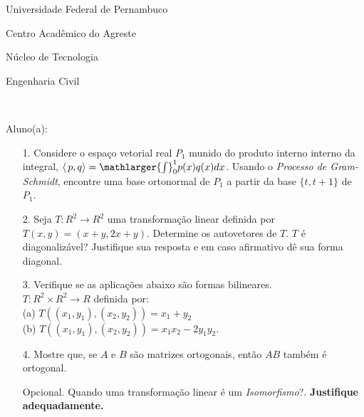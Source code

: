 \documentclass[oneside,a4paper,12pt]{article}
\newcommand{\universidade}{Universidade Federal de Pernambuco}
\newcommand{\centro}{Centro Acadêmico do Agreste}
\newcommand{\departamento}{Núcleo de Tecnologia}
\newcommand{\curso}{Engenharia Civil}
\begin{document}
     \begin{center}
     	\vspace{0pt}
     	
     	\universidade
     	\par
     	\centro
     	\par
     	\departamento
     	\par
     	\curso
     	\par
     	\vspace{08pt}
     	\\
     \end{center}
     
     \begin{flushleft}
     	Aluno(a):
     \end{flushleft}
 
\begin{itemize}
	\item[1.] Considere o espaço vetorial real $P_{1}$ munido do produto interno interno da integral, $\langle\,p,q\rangle=\mathlarger{\int}_{0}^{1}p(x)q(x)dx$. Usando o \textit{Processo de Gram-Schmidt}, encontre uma base ortonormal de $P_{1}$ a partir da base $\{t,t+1\}$ de $P_{1}$.
\end{itemize}
\begin{itemize}
	\item[2.] Seja $T:R^{2}\longrightarrow R^{2}$ uma transformação linear definida por $T(x,y)=(x+y,2x+y)$. Determine os autovetores de $T$. $T$ é diagonalizável? Justifique sua resposta e em caso afirmativo dê sua forma diagonal. 
\end{itemize}
\begin{itemize}
	\item [3.] Verifique se as aplicações abaixo são formas bilineares.\\
	$T:R^{2}\times R^{2}\longrightarrow R$ definida por:\\ (a) $T((x_{1},y_{1}),(x_{2},y_{2}))=x_{1}+y_{2}$ \\
	(b) $T((x_{1},y_{1}),(x_{2},y_{2}))=x_{1}x_{2}-2y_{1}y_{2}$.
\end{itemize}
\begin{itemize}
	\item[4.] Mostre que, se $A$ e $B$ são matrizes ortogonais, então $AB$ também é ortogonal.
\end{itemize}
\begin{itemize}
	\item[Opcional.] Quando uma transformação linear é um \textit{Isomorfismo}?. \textbf{Justifique adequadamente.}
	
\end{itemize}
\end{document}
